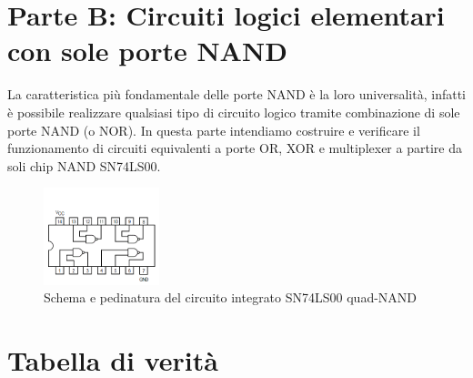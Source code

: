 \documentclass[10pt, a4paper, italian]{article}
\begin{document}
\setcounter{section}{3}
\section*{Parte B: Circuiti logici elementari con sole porte NAND}
La caratteristica più fondamentale delle porte NAND è la loro universalità,
infatti è possibile realizzare qualsiasi tipo di circuito logico tramite
combinazione di sole porte NAND (o NOR). In questa parte intendiamo costruire
e verificare il funzionamento di circuiti equivalenti a porte OR, XOR e
multiplexer a partire da soli chip NAND SN74LS00.
\begin{figure}[htbp]
\centering
    \includegraphics[width=0.3\textwidth]{NAND}
    \caption{Schema e pedinatura del circuito integrato SN74LS00 quad-NAND
    \label{fig: NAND}}
\end{figure}

\section{Tabella di verità}
\end{document}
